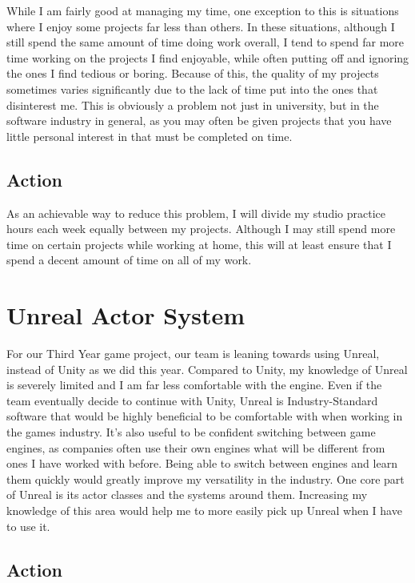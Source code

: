 \documentclass{scrartcl}
\begin{document}
While I am fairly good at managing my time, one exception to this is situations where I enjoy some projects far less than others. In these situations, although I still spend the same amount of time doing work overall, I tend to spend far more time working on the projects I find enjoyable, while often putting off and ignoring the ones I find tedious or boring. Because of this, the quality of my projects sometimes varies significantly due to the lack of time put into the ones that disinterest me. This is obviously a problem not just in university, but in the software industry in general, as you may often be given projects that you have little personal interest in that must be completed on time.


\subsection{Action}

As an achievable way to reduce this problem, I will divide my studio practice hours each week equally between my projects. Although I may still spend more time on certain projects while working at home, this will at least ensure that I spend a decent amount of time on all of my work.


\section{Unreal Actor System}

For our Third Year game project, our team is leaning towards using Unreal, instead of Unity as we did this year. Compared to Unity, my knowledge of Unreal is severely limited and I am far less comfortable with the engine. Even if the team eventually decide to continue with Unity, Unreal is Industry-Standard software that would be highly beneficial to be comfortable with when working in the games industry. It’s also useful to be confident switching between game engines, as companies often use their own engines what will be different from ones I have worked with before. Being able to switch between engines and learn them quickly would greatly improve my versatility in the industry. One core part of Unreal is its actor classes and the systems around them. Increasing my knowledge of this area would help me to more easily pick up Unreal when I have to use it.


\subsection{Action} 
\end{document}

